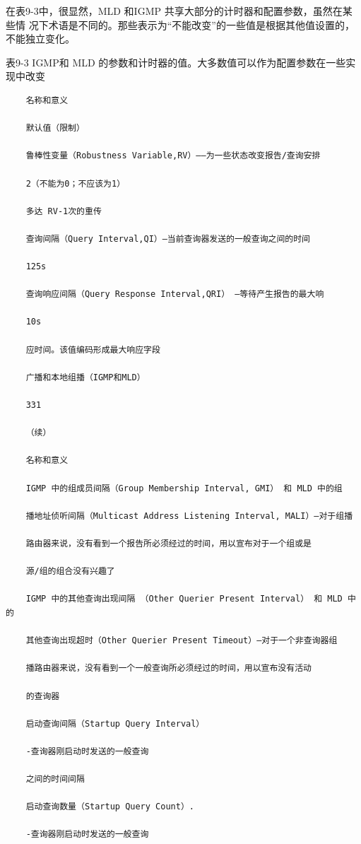 在表9-3中，很显然，MLD 和IGMP 共享大部分的计时器和配置参数，虽然在某些情
况下术语是不同的。那些表示为“不能改变”的一些值是根据其他值设置的，不能独立变化。

表9-3 IGMP和 MLD 的参数和计时器的值。大多数值可以作为配置参数在一些实现中改变

\begin{verbatim}
    名称和意义
    
    默认值（限制）
    
    鲁棒性变量（Robustness Variable,RV）——为一些状态改变报告/查询安排
    
    2（不能为0；不应该为1）
    
    多达 RV-1次的重传
    
    查询间隔（Query Interval,QI）—当前查询器发送的一般查询之间的时间
    
    125s
    
    查询响应间隔（Query Response Interval,QRI） —等待产生报告的最大响
    
    10s
    
    应时间。该值编码形成最大响应字段
    
    广播和本地组播（IGMP和MLD）
    
    331
    
    （续）
    
    名称和意义
    
    IGMP 中的组成员间隔（Group Membership Interval, GMI） 和 MLD 中的组
    
    播地址侦听间隔（Multicast Address Listening Interval, MALI）—对于组播
    
    路由器来说，没有看到一个报告所必须经过的时间，用以宣布对于一个组或是
    
    源/组的组合没有兴趣了
    
    IGMP 中的其他查询出现间隔 （Other Querier Present Interval） 和 MLD 中的
    
    其他查询出现超时（Other Querier Present Timeout）—对于一个非查询器组
    
    播路由器来说，没有看到一个一般查询所必须经过的时间，用以宣布没有活动
    
    的查询器
    
    启动查询间隔（Startup Query Interval）
    
    -查询器刚启动时发送的一般查询
    
    之间的时间间隔
    
    启动查询数量（Startup Query Count）.
    
    -查询器刚启动时发送的一般查询
    

\end{verbatim}
